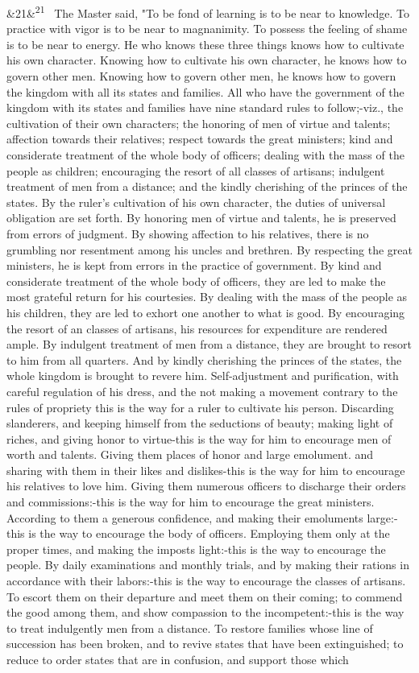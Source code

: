 \documentclass[12pt]{article}
\newcommand{\para}[1][]{\par\noindent\ifx&#1&\else\textsuperscript{\footnotesize #1}~\fi}
\begin{document}
\para[21] The Master said, "To be fond of learning is to be near to knowledge. To practice with vigor is to be near to magnanimity. To possess the feeling of shame is to be near to energy. He who knows these three things knows how to cultivate his own character. Knowing how to cultivate his own character, he knows how to govern other men. Knowing how to govern other men, he knows how to govern the kingdom with all its states and families. All who have the government of the kingdom with its states and families have nine standard rules to follow;-viz., the cultivation of their own characters; the honoring of men of virtue and talents; affection towards their relatives; respect towards the great ministers; kind and considerate treatment of the whole body of officers; dealing with the mass of the people as children; encouraging the resort of all classes of artisans; indulgent treatment of men from a distance; and the kindly cherishing of the princes of the states. By the ruler's cultivation of his own character, the duties of universal obligation are set forth. By honoring men of virtue and talents, he is preserved from errors of judgment. By showing affection to his relatives, there is no grumbling nor resentment among his uncles and brethren. By respecting the great ministers, he is kept from errors in the practice of government. By kind and considerate treatment of the whole body of officers, they are led to make the most grateful return for his courtesies. By dealing with the mass of the people as his children, they are led to exhort one another to what is good. By encouraging the resort of an classes of artisans, his resources for expenditure are rendered ample. By indulgent treatment of men from a distance, they are brought to resort to him from all quarters. And by kindly cherishing the princes of the states, the whole kingdom is brought to revere him. Self-adjustment and purification, with careful regulation of his dress, and the not making a movement contrary to the rules of propriety this is the way for a ruler to cultivate his person. Discarding slanderers, and keeping himself from the seductions of beauty; making light of riches, and giving honor to virtue-this is the way for him to encourage men of worth and talents. Giving them places of honor and large emolument. and sharing with them in their likes and dislikes-this is the way for him to encourage his relatives to love him. Giving them numerous officers to discharge their orders and commissions:-this is the way for him to encourage the great ministers. According to them a generous confidence, and making their emoluments large:-this is the way to encourage the body of officers. Employing them only at the proper times, and making the imposts light:-this is the way to encourage the people. By daily examinations and monthly trials, and by making their rations in accordance with their labors:-this is the way to encourage the classes of artisans. To escort them on their departure and meet them on their coming; to commend the good among them, and show compassion to the incompetent:-this is the way to treat indulgently men from a distance. To restore families whose line of succession has been broken, and to revive states that have been extinguished; to reduce to order states that are in confusion, and support those which 
\end{document}
